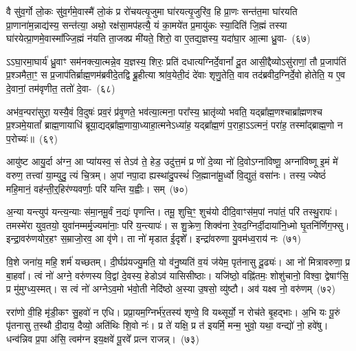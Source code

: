 वै सु॑व॒र्गो लो॒कः सु॑व॒र्गमे॒वास्मै॑ लो॒कं प्र रो॑चयत्यृ॒जुमा घा॑रयत्यृ॒जुरि॑व॒ हि प्रा॒णः सन्त॑त॒मा घा॑रयति प्रा॒णाना॑म॒न्नाद्य॑स्य॒ सन्त॑त्या॒ अथो॒ रक्ष॑सा॒मप॑हत्यै॒ यं का॒मये॑त प्र॒मायु॑कः स्या॒दिति॑ जि॒ह्मं तस्या घा॑रयेत्प्रा॒णमे॒वास्मा᳚ज्जि॒ह्मं न॑यति ता॒जक्प्र मी॑यते॒ शिरो॒ वा ए॒तद्य॒ज्ञस्य॒ यदा॑घा॒र आ॒त्मा ध्रु॒वा-~(६७)

ऽऽघा॒रमा॒घार्य॑ ध्रु॒वाꣳ सम॑नक्त्या॒त्मन्ने॒व य॒ज्ञस्य॒ शिरः॒ प्रति॑ दधा\-त्य\-ग्निर्दे॒वानां᳚ दू॒त आसी॒द्दैव्यो\-ऽसु॑राणां॒ तौ प्र॒जा\-प॑तिं प्र॒श्ञमैता॒ꣳ॒ स प्र॒जा\-प॑तिर्ब्राह्म॒णम॑ब्रवीदे॒तद्वि ब्रू॒हीत्या श्रा॑व॒येती॒दं दे॑वाः शृणु॒तेति॒ वाव तद॑ब्रवीद॒ग्निर्दे॒वो होतेति॒ य ए॒व दे॒वानां॒ तम॑वृणीत॒ ततो॑ \mbox{दे॒वा-~(६८)}

अभ॑व॒न्परा॑सुरा॒ यस्यै॒वं वि॒दुषः॑ प्रव॒रं प्र॑वृ॒णते॒ भव॑त्या॒त्मना॒ परा᳚स्य॒ भ्रातृ॑व्यो भवति॒ यद्ब्रा᳚ह्म॒णश्चाब्रा᳚ह्मणश्च प्र॒श्ञमे॒यातां᳚ ब्राह्म॒णायाधि॑ ब्रूया॒द्यद्ब्रा᳚ह्म॒णाया॒ध्याहा॒त्मने\-ऽध्या॑ह॒ यद्ब्रा᳚ह्म॒णं प॒राहा॒ऽऽत्मनं॒ परा॑ह॒ तस्मा᳚द्ब्राह्म॒णो न प॒रोच्यः॑॥~(६९)

{\anuvakamend[{वा आ॑र॒ण्याꣴश्चाव॑ रु॒न्धे\-ऽथो॑ प॒शुभिः॒ सो᳚\-ऽब्रवीद्दक्षिणा॒र्ध्य॑न्त्रय॑ इव ध्रु॒वा दे॒वाश्च॑त्वारि॒ꣳ॒शच्च॑}]}%

आयु॑ष्ट आयु॒र्दा अ॑ग्न॒ आ प्या॑यस्व॒ सं ते\-ऽव॑ ते॒ हेड॒ उदु॑त्त॒मं प्र णो॑ दे॒व्या नो॑ दि॒वो\-ऽग्ना॑विष्णू॒ अग्ना॑विष्णू इ॒मं मे॑ वरुण॒ तत्त्वा॑ या॒म्युदु॒ त्यं चि॒त्रम्। अ॒पां नपा॒दा ह्यस्था॑दु॒पस्थं॑ जि॒ह्माना॑मू॒र्ध्वो वि॒द्युतं॒ वसा॑नः। तस्य॒ ज्येष्ठं॑ महि॒मानं॒ वह॑न्ती॒र्॒\mbox{}हिर॑ण्यवर्णाः॒ परि॑ यन्ति य॒ह्वीः। सम्~(७०)

अ॒न्या यन्त्युप॑ यन्त्य॒न्याः स॑मा॒नमू॒र्वं न॒द्यः॑ पृणन्ति। तमू॒ शुचि॒ꣳ॒ शुच॑यो दीदि॒वाꣳस॑म॒पां नपा॑तं॒ परि॑ तस्थु॒रापः॑। तमस्मे॑रा युव॒तयो॒ युवा॑नम्मर्मृ॒ज्यमा॑नाः॒ परि॑ य॒न्त्यापः॑। स शु॒क्रेण॒ शिक्व॑ना रे॒वद॒ग्निर्दी॒दाया॑नि॒ध्मो घृ॒तनि॑र्णिग॒फ्सु। इन्द्रा॒वरु॑णयोर॒हꣳ स॒म्राजो॒रव॒ आ वृ॑णे। ता नो॑ मृडात ई॒दृशे᳚। इन्द्रा॑वरुणा यु॒वम॑ध्व॒राय॑ नः~(७१)

वि॒शे जना॑य॒ महि॒ शर्म॑ यच्छतम्। दी॒र्घप्र॑यज्यु॒मति॒ यो व॑नु॒ष्यति॑ व॒यं ज॑येम॒ पृत॑नासु दू॒ढ्यः॑। आ नो॑ मित्रावरुणा॒ प्र बा॒हवा᳚। त्वं नो॑ अग्ने॒ वरु॑णस्य वि॒द्वां दे॒वस्य॒ हेडो\-ऽव॑ यासिसीष्ठाः। यजि॑ष्ठो॒ वह्नि॑तमः॒ शोशु॑चानो॒ विश्वा॒ द्वेषाꣳ॑सि॒ प्र मु॑मुग्ध्य॒स्मत्। स त्वं नो॑ अग्ने\-ऽव॒मो भ॑वो॒ती नेदि॑ष्ठो अ॒स्या उ॒षसो॒ व्यु॑ष्टौ। अव॑ यक्ष्व नो॒ वरु॑णम्~(७२)

ररा॑णो वी॒हि मृ॑डी॒कꣳ सु॒हवो॑ न एधि। प्रप्रा॒यम॒ग्निर्भ॑र॒तस्य॑ शृण्वे॒ वि यथ्सूर्यो॒ न रोच॑ते बृ॒हद्भाः। अ॒भि यः पू॒रुं पृ॑तनासु त॒स्थौ दी॒दाय॒ दैव्यो॒ अति॑थिः शि॒वो नः॑। प्र ते॑ यक्षि॒ प्र त॑ इयर्मि॒ मन्म॒ भुवो॒ यथा॒ वन्द्यो॑ नो॒ हवे॑षु। धन्व॑न्निव प्र॒पा अ॑सि॒ त्वम॑ग्न इय॒क्षवे॑ पू॒रवे᳚ प्रत्न राजन्न्।~(७३)

